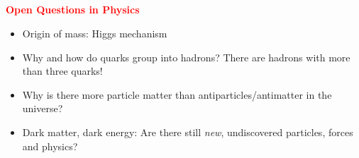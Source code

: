\subsection{}
\begin{frame}

\textbf{\textcolor{red}{Open Questions in Physics}}
    \begin{itemize}
         \item [\ding{73}] Origin of mass: Higgs mechanism
            \item [\ding{73}] Why and how do quarks group into hadrons? There are hadrons with more than three quarks!
            \item [\ding{73}] Why is there more particle matter than antiparticles/antimatter in the universe?
            \item [\ding{73}] Dark matter, dark energy: Are there still \emph{new}, undiscovered particles, forces and physics?
    \end{itemize}

\end{frame}

